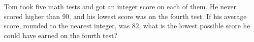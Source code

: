 Tom took five math tests and got an integer score on each of them. He never scored higher than $90$, and his lowest score was on the fourth test. If his average score, rounded to the nearest integer, was $82$, what is the lowest possible score he could have earned on the fourth test?
